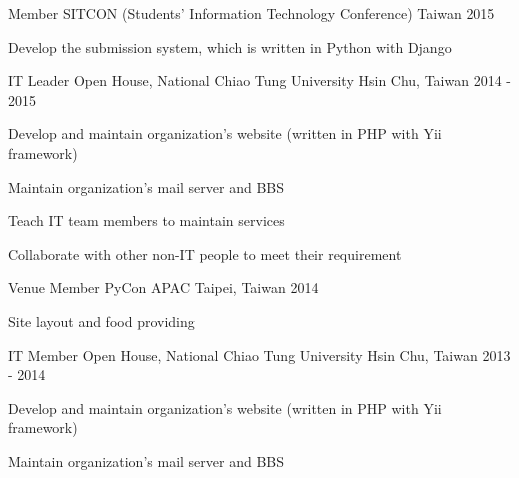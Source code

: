 

\begin{cventries}


  \cventry
    {Member}
    {SITCON (Students' Information Technology Conference)}
    {Taiwan}
    {2015}
    {
      \begin{cvitems}
        \item {Develop the submission system, which is written in Python with Django}
      \end{cvitems}
    }

  \cventry
    {IT Leader}
    {Open House, National Chiao Tung University}
    {Hsin Chu, Taiwan}
    {2014 - 2015}
    {
      \begin{cvitems}
        \item {Develop and maintain organization's website (written in PHP with Yii framework)}
        \item {Maintain organization's mail server and BBS}
        \item {Teach IT team members to maintain services}
        \item {Collaborate with other non-IT people to meet their requirement}
      \end{cvitems}
    }

  \cventry
    {Venue Member}
    {PyCon APAC}
    {Taipei, Taiwan}
    {2014}
    {
      \begin{cvitems}
        \item {Site layout and food providing}
      \end{cvitems}
    }

  \cventry
    {IT Member}
    {Open House, National Chiao Tung University}
    {Hsin Chu, Taiwan}
    {2013 - 2014}
    {
      \begin{cvitems}
        \item {Develop and maintain organization's website (written in PHP with Yii framework)}
        \item {Maintain organization's mail server and BBS}
      \end{cvitems}
    }

\end{cventries}
